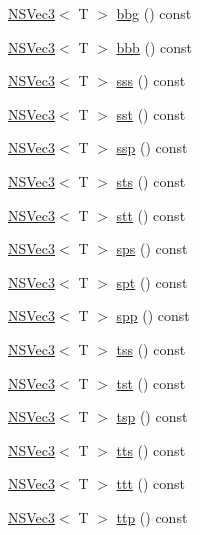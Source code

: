 \begin{DoxyCompactItemize}
\item 
\hyperlink{structNSVec3}{N\-S\-Vec3}$<$ T $>$ \hyperlink{structNSVec3_abc9234ad9b3b8ae95fcff246f95a2916}{bbg} () const 
\item 
\hyperlink{structNSVec3}{N\-S\-Vec3}$<$ T $>$ \hyperlink{structNSVec3_a7b7f3cf0e2f486fa968fd5bf856082d7}{bbb} () const 
\item 
\hyperlink{structNSVec3}{N\-S\-Vec3}$<$ T $>$ \hyperlink{structNSVec3_aa8d8bb0186c557c09a99783a1de39b17}{sss} () const 
\item 
\hyperlink{structNSVec3}{N\-S\-Vec3}$<$ T $>$ \hyperlink{structNSVec3_a10e6ba89601042d96928720462fe979f}{sst} () const 
\item 
\hyperlink{structNSVec3}{N\-S\-Vec3}$<$ T $>$ \hyperlink{structNSVec3_aeec2d01006d3e2579c09ca1d6c4e7c06}{ssp} () const 
\item 
\hyperlink{structNSVec3}{N\-S\-Vec3}$<$ T $>$ \hyperlink{structNSVec3_a3294f31d1a0035f1546bec513da827a7}{sts} () const 
\item 
\hyperlink{structNSVec3}{N\-S\-Vec3}$<$ T $>$ \hyperlink{structNSVec3_a67b8f7eae1737a961b410ba95a7737b7}{stt} () const 
\item 
\hyperlink{structNSVec3}{N\-S\-Vec3}$<$ T $>$ \hyperlink{structNSVec3_a67127158fb51c8ce231d1097dcb8ff97}{sps} () const 
\item 
\hyperlink{structNSVec3}{N\-S\-Vec3}$<$ T $>$ \hyperlink{structNSVec3_a738299bcd3fca3669564976a04e5225d}{spt} () const 
\item 
\hyperlink{structNSVec3}{N\-S\-Vec3}$<$ T $>$ \hyperlink{structNSVec3_a7c380c5369f89818cde793cc0721e94c}{spp} () const 
\item 
\hyperlink{structNSVec3}{N\-S\-Vec3}$<$ T $>$ \hyperlink{structNSVec3_a37401a42fd53e387c354c28c085dfeca}{tss} () const 
\item 
\hyperlink{structNSVec3}{N\-S\-Vec3}$<$ T $>$ \hyperlink{structNSVec3_abe97141c34ef70a2dee655b95eff4b83}{tst} () const 
\item 
\hyperlink{structNSVec3}{N\-S\-Vec3}$<$ T $>$ \hyperlink{structNSVec3_ab51c066e51f84cd005f970168455e883}{tsp} () const 
\item 
\hyperlink{structNSVec3}{N\-S\-Vec3}$<$ T $>$ \hyperlink{structNSVec3_a10b361243d15166429f9210501da3afc}{tts} () const 
\item 
\hyperlink{structNSVec3}{N\-S\-Vec3}$<$ T $>$ \hyperlink{structNSVec3_af2e4fd3bbdb2cb4f57b85129eef689d4}{ttt} () const 
\item 
\hyperlink{structNSVec3}{N\-S\-Vec3}$<$ T $>$ \hyperlink{structNSVec3_ace1acc2030a5b55ab39f588ddaab664a}{ttp} () const 

\end{DoxyCompactItemize}
